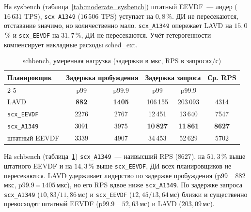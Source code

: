 \documentclass[14pt, oneside]{extbook}
\begin{document}
        На sysbench (таблица~\ref{tab:moderate_sysbench})
        штатный EEVDF~--- лидер ($16\,631$ TPS),
        \texttt{scx\_A1349} ($16\,506$ TPS) уступает на
        $0{,}8$\,\%. ДИ не пересекаются, отставание значимо,
        но количественно мало. \texttt{scx\_A1349} опережает
        LAVD на $15{,}0$\,\% и \texttt{scx\_EEVDF} на
        $31{,}7$\,\%, ДИ не пересекаются. Учёт гетерогенности
        компенсирует накладные расходы sched\_ext.

        \begin{table}[H]
                \centering
                \caption{schbench, умеренная нагрузка (задержки в мкс, RPS в запросах/с)}
                \label{tab:moderate_schbench}
                \vspace{0.4em}
                \begin{tabular}{|l|c|c|c|c|c|}
                        \hline
                        \multirow{2}{*}{Планировщик}
                                & \multicolumn{2}{c|}{Задержка пробуждения}
                                & \multicolumn{2}{c|}{Задержка запроса}
                                & \multirow{2}{*}{Ср. RPS} \\
                        \cline{2-5}
                                & p99 & p99.9 & p99 & p99.9 & \\
                        \hline
                        LAVD                & \textbf{882} & \textbf{1405} & 106\,155         & 203\,093         & 4314 \\
                        \texttt{scx\_EEVDF} & 2276         & 2767          & 12\,451          & 13\,640          & 7547 \\
                        \texttt{scx\_A1349} & 3091         & 3975          & \textbf{10\,827} & \textbf{11\,861} & \textbf{8627} \\
                        штатный EEVDF       & 3339         & 4907          & 34\,453          & 52\,629          & 5702 \\
                        \hline
                \end{tabular}
        \end{table}

        На schbench (таблица~\ref{tab:moderate_schbench})
        \texttt{scx\_A1349}~--- наивысший RPS ($8627$), на
        $51{,}3$\,\% выше штатного EEVDF и на $14{,}3$\,\%
        выше \texttt{scx\_EEVDF}, ДИ всех планировщиков не
        пересекаются. LAVD удерживает лидерство по задержке
        пробуждения (p99\,=\,$882$\,мкс, p99.9\,=\,$1405$\,мкс),
        но его RPS вдвое ниже \texttt{scx\_A1349}. По задержке
        запроса \texttt{scx\_A1349} ($10{,}83$/$11{,}86$\,мс)
        и \texttt{scx\_EEVDF} ($12{,}45$/$13{,}64$\,мс) близки
        и существенно превосходят штатный EEVDF
        (p99.9\,=\,$52{,}63$\,мс) и LAVD ($203{,}09$\,мс).
\end{document}
